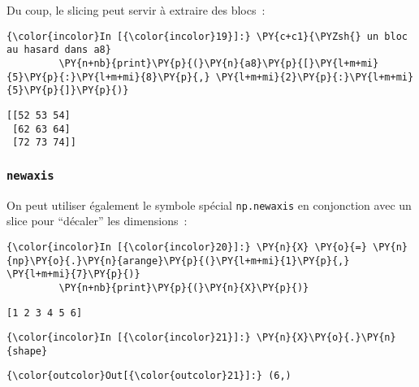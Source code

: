     Du coup, le slicing peut servir à extraire des blocs~:

    \begin{Verbatim}[commandchars=\\\{\}]
{\color{incolor}In [{\color{incolor}19}]:} \PY{c+c1}{\PYZsh{} un bloc au hasard dans a8}
         \PY{n+nb}{print}\PY{p}{(}\PY{n}{a8}\PY{p}{[}\PY{l+m+mi}{5}\PY{p}{:}\PY{l+m+mi}{8}\PY{p}{,} \PY{l+m+mi}{2}\PY{p}{:}\PY{l+m+mi}{5}\PY{p}{]}\PY{p}{)}
\end{Verbatim}


    \begin{Verbatim}[commandchars=\\\{\}]
[[52 53 54]
 [62 63 64]
 [72 73 74]]

    \end{Verbatim}

    \hypertarget{newaxis}{%
\subsubsection{\texorpdfstring{\texttt{newaxis}}{newaxis}}\label{newaxis}}

    On peut utiliser également le symbole spécial \texttt{np.newaxis} en
conjonction avec un slice pour ``décaler'' les dimensions~:

    \begin{Verbatim}[commandchars=\\\{\}]
{\color{incolor}In [{\color{incolor}20}]:} \PY{n}{X} \PY{o}{=} \PY{n}{np}\PY{o}{.}\PY{n}{arange}\PY{p}{(}\PY{l+m+mi}{1}\PY{p}{,} \PY{l+m+mi}{7}\PY{p}{)}
         \PY{n+nb}{print}\PY{p}{(}\PY{n}{X}\PY{p}{)}
\end{Verbatim}


    \begin{Verbatim}[commandchars=\\\{\}]
[1 2 3 4 5 6]

    \end{Verbatim}

    \begin{Verbatim}[commandchars=\\\{\}]
{\color{incolor}In [{\color{incolor}21}]:} \PY{n}{X}\PY{o}{.}\PY{n}{shape}
\end{Verbatim}


\begin{Verbatim}[commandchars=\\\{\}]
{\color{outcolor}Out[{\color{outcolor}21}]:} (6,)
\end{Verbatim}
            

